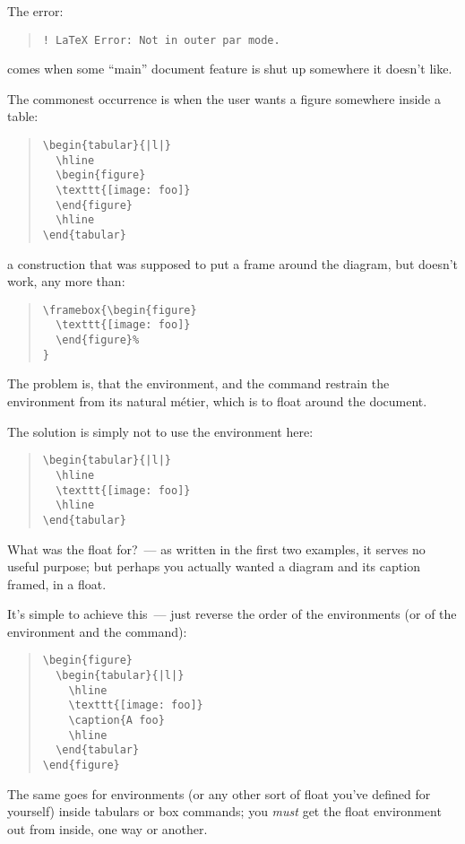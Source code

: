 {

The error:
\begin{quote}
\begin{verbatim}
! LaTeX Error: Not in outer par mode.
\end{verbatim}
\end{quote}
comes when some ``main'' document feature is shut up somewhere it
doesn't like.

The commonest occurrence is when the user wants a figure somewhere
inside a table:
\begin{quote}
\begin{verbatim}
\begin{tabular}{|l|}
  \hline
  \begin{figure}
  \texttt{[image: foo]}
  \end{figure}
  \hline
\end{tabular}
\end{verbatim}
\end{quote}
a construction that was supposed to put a frame around the diagram,
but doesn't work, any more than:
\begin{quote}
\begin{verbatim}
\framebox{\begin{figure}
  \texttt{[image: foo]}
  \end{figure}%
}
\end{verbatim}
\end{quote}
The problem is, that the  environment, and the
 command restrain the  environment
from its natural m\'etier, which is to float around the document.

The solution is simply not to use the  environment
here:
\begin{quote}
\begin{verbatim}
\begin{tabular}{|l|}
  \hline
  \texttt{[image: foo]}
  \hline
\end{tabular}
\end{verbatim}
\end{quote}
What was the float for?~--- as written in the first two examples, it
serves no useful purpose; but perhaps you actually wanted a diagram
and its caption framed, in a float.

It's simple to achieve this~--- just reverse the order of the
environments (or of the  environment and the
command):
\begin{quote}
\begin{verbatim}
\begin{figure}
  \begin{tabular}{|l|}
    \hline
    \texttt{[image: foo]}
    \caption{A foo}
    \hline
  \end{tabular}
\end{figure}
\end{verbatim}
\end{quote}
The same goes for  environments (or any other sort
of float you've defined for yourself) inside tabulars or box commands;
you \emph{must} get the float environment out from inside, one way or
another.

}
